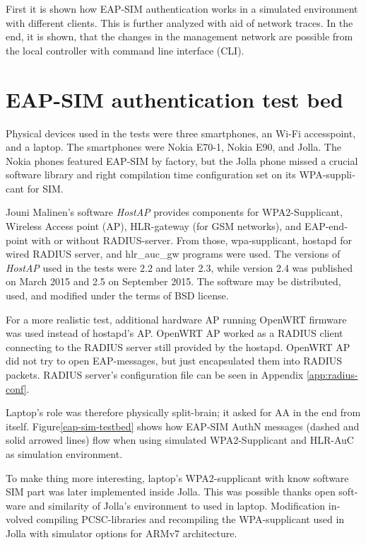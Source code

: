 \documentclass[12pt,a4paper,english]{tutthesis}
\begin{document}
\begin{otherlanguage}{english}
First it is shown how EAP-SIM authentication works in a simulated
environment with different clients.
This is further analyzed with aid of network traces.
In the end, it is shown, that the changes in the management network are possible from
the local controller with  command line interface (CLI).



\section{EAP-SIM authentication test bed}
\label{sec-5-1}



Physical devices used in the tests  were three smartphones, an Wi-Fi accesspoint, and a laptop.
The smartphones were Nokia E70-1, Nokia E90, and Jolla. The Nokia phones
featured EAP-SIM by factory, but the Jolla phone missed a crucial
software library
and right compilation time configuration set on its WPA-supplicant for SIM.

Jouni Malinen's software \emph{HostAP}\cite{hostapd} provides
components for WPA2-Supplicant, Wireless Access point (AP),
HLR-gateway (for GSM networks), and EAP-endpoint with or without
RADIUS-server. From those, wpa-supplicant, hostapd for wired RADIUS
server, and hlr\_auc\_gw programs were used.  
The versions of \emph{HostAP} used in the tests were 2.2 and later 2.3,
while version 2.4 was published on March 2015 and 2.5 on September 2015. The software
may be distributed, used, and modified under the terms of BSD license.

For a more realistic test, additional hardware AP running OpenWRT
firmware was used instead of hostapd's AP. OpenWRT AP worked as a
RADIUS client connecting to the RADIUS server still provided by the
hostapd.  OpenWRT AP did not try to open EAP-messages, but just
encapsulated them into RADIUS packets.  RADIUS server's configuration
file can be seen in Appendix \ref{app:radius-conf}.


Laptop's role was therefore physically split-brain; it asked for AA in
the end from itself.
Figure\ref{eap-sim-testbed} shows how EAP-SIM AuthN messages (dashed
and solid arrowed lines) flow when using 
simulated WPA2-Supplicant and HLR-AuC as simulation environment.

To make thing more interesting, laptop's WPA2-supplicant with know
software SIM part was later implemented inside Jolla. This was
possible thanks open software and similarity of Jolla's environment to
used in laptop. Modification involved compiling PCSC-libraries and
recompiling the WPA-supplicant used in Jolla with simulator options 
for ARMv7 architecture.




\end{otherlanguage}
\end{document}
